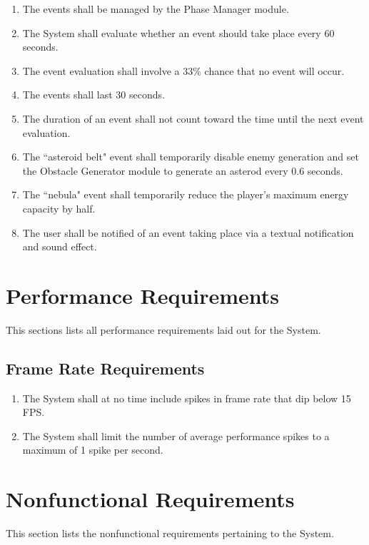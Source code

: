 \documentclass[12pt]{report}
\newenvironment{reqlist}{
	\renewcommand{\labelenumi}{\tab\thesubsection.\arabic{enumi}}
	\renewcommand{\labelenumii}{\thesubsection.\arabic{enumi}.\arabic{enumii}}
	\begin{enumerate}[itemsep = 1pt, parsep = 0pt, leftmargin = *]
}{\end{enumerate}}
\begin{document}
\begin{reqlist}
\begin{reqlist}
				\item The events shall be managed by the Phase Manager module.
				\item The System shall evaluate whether an event should take place every 60 seconds.
				\item The event evaluation shall involve a 33\% chance that no event will occur.
				\item The events shall last 30 seconds.
				\item The duration of an event shall not count toward the time until the next event evaluation.
				\item The ``asteroid belt" event shall temporarily disable enemy generation and set the Obstacle Generator module to generate an asterod every 0.6 seconds.
				\item The ``nebula" event shall temporarily reduce the player's maximum energy capacity by half.
				\item The user shall be notified of an event taking place via a textual notification and sound effect.
			\end{reqlist}
		\end{reqlist}


\section{Performance Requirements}
	This sections lists all performance requirements laid out for the System.
	\subsection{Frame Rate Requirements}
	\begin{reqlist}
		\item The System shall at no time include spikes in frame rate that dip below 15 FPS.
		\item The System shall limit the number of average performance spikes to a maximum of 1 spike per second.
	\end{reqlist}

\section{Nonfunctional Requirements}
	This section lists the nonfunctional requirements pertaining to the System. 
\end{document}
